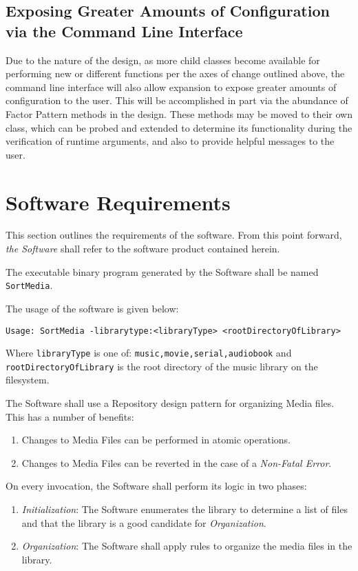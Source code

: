 \documentclass{designdoc}
\begin{document}
\subsection{Exposing Greater Amounts of Configuration via the Command Line
  Interface}
Due to the nature of the design, as more child classes become available for
performing new or different functions per the axes of change outlined above,
the command line interface will also allow expansion to expose greater amounts
of configuration to the user. This will be accomplished in part via the
abundance of Factor Pattern methods in the design. These methods may be moved
to their own class, which can be probed and extended to determine its
functionality during the verification of runtime arguments, and also to provide
helpful messages to the user.

\section{Software Requirements}
This section outlines the requirements of the software. From this point
forward, \emph{the Software} shall refer to the software product contained
herein.

The executable binary program generated by the Software shall be named
\texttt{SortMedia}.

The usage of the software is given below:

\begin{verbatim}
Usage: SortMedia -librarytype:<libraryType> <rootDirectoryOfLibrary>
\end{verbatim}

Where \texttt{libraryType} is one of: \texttt{music,movie,serial,audiobook} and
\texttt{rootDirectoryOfLibrary} is the root directory of the music library on
the filesystem.

The Software shall use a Repository design pattern for organizing Media files.
This has a number of benefits:
\begin{enumerate}
\item Changes to Media Files can be performed in atomic operations.
\item Changes to Media Files can be reverted in the case of a
  \textit{Non-Fatal Error}.
\end{enumerate}

On every invocation, the Software shall perform its logic in two phases:
\begin{enumerate}
\item \textit{Initialization}: The Software enumerates the library to determine
  a list of files and that the library is a good candidate for
  \textit{Organization}.
\item \textit{Organization}: The Software shall apply rules to organize the
  media files in the library.
\end{enumerate}
\end{document}

